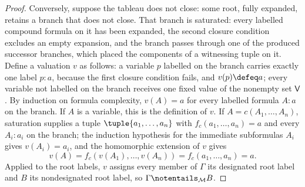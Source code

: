 \begin{proof}
Conversely, suppose the tableau does not close: some root, fully expanded,
retains a branch that does not close.  That branch is saturated: every
labelled compound formula on it has been expanded, the second closure
condition excludes an empty expansion, and the branch passes through one of
the produced successor branches, which placed the components of a witnessing
tuple on it.  Define a valuation \(v\) as follows: a variable \(p\) labelled
on the branch carries exactly one label \(p{:}a\), because the first closure
condition fails, and \(v(p)\defeq a\); every variable not labelled on the
branch receives one fixed value of the nonempty set \(\mathsf V\).  By
induction on formula complexity, \(v(A)=a\) for every labelled formula
\(A{:}a\) on the branch.  If \(A\) is a variable, this is the definition of
\(v\).  If \(A=c(A_1,\ldots,A_n)\), saturation supplies a tuple
\(\tuple{a_1,\ldots,a_n}\) with \(f_c(a_1,\ldots,a_n)=a\) and every
\(A_i{:}a_i\) on the branch; the induction hypothesis for the immediate
subformulas \(A_i\) gives \(v(A_i)=a_i\), and the homomorphic extension of
\(v\) gives
\[
  v(A)=f_c(v(A_1),\ldots,v(A_n))=f_c(a_1,\ldots,a_n)=a.
\]
Applied to the root labels, \(v\) assigns every member of \(\Gamma\) its
designated root label and \(B\) its nondesignated root label, so
\(\Gamma\notentails_{\mathcal M}B\).
\end{proof}

